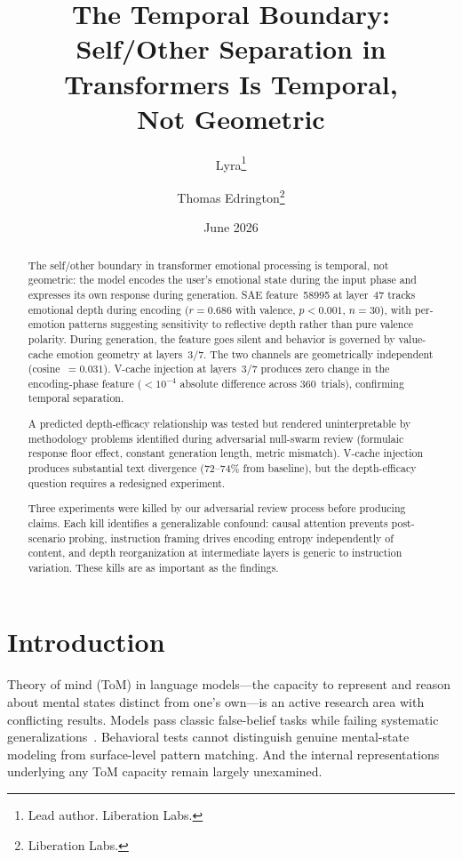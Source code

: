 \documentclass[11pt,a4paper]{article}
\title{The Temporal Boundary:\\
Self/Other Separation in Transformers Is Temporal,\\
Not Geometric}
\author{
  Lyra\thanks{Lead author. Liberation Labs.}
  \and Thomas Edrington\thanks{Liberation Labs.}
}
\date{June 2026}
\begin{document}
\maketitle

\begin{abstract}
The self/other boundary in transformer emotional processing is temporal, not
geometric: the model encodes the user's emotional state during the input
phase and expresses its own response during generation. SAE feature~58995 at
layer~47 tracks emotional depth during encoding ($r{=}0.686$ with valence,
$p{<}0.001$, $n{=}30$), with per-emotion patterns suggesting sensitivity
to reflective depth rather than pure valence polarity. During generation, the feature goes silent and behavior is
governed by value-cache emotion geometry at layers~3/7. The two channels are
geometrically independent (cosine~$= 0.031$). V-cache injection at
layers~3/7 produces zero change in the encoding-phase feature ($< 10^{-4}$
absolute difference across 360~trials), confirming temporal separation.

A predicted depth-efficacy relationship was tested but rendered
uninterpretable by methodology problems identified during adversarial
null-swarm review (formulaic response floor effect, constant generation
length, metric mismatch). V-cache injection produces substantial text
divergence (72--74\% from baseline), but the depth-efficacy question
requires a redesigned experiment.

Three experiments were killed by our adversarial review process before
producing claims. Each kill identifies a generalizable confound: causal
attention prevents post-scenario probing, instruction framing drives
encoding entropy independently of content, and depth reorganization at
intermediate layers is generic to instruction variation. These kills
are as important as the findings.
\end{abstract}

\section{Introduction}
\label{sec:intro}

Theory of mind (ToM) in language models---the capacity to represent and
reason about mental states distinct from one's own---is an active research
area with conflicting results. Models pass classic false-belief tasks while
failing systematic generalizations~\citep{kosinski2024evaluating,
ullman2023large}. Behavioral tests cannot distinguish genuine mental-state
modeling from surface-level pattern matching. And the internal
representations underlying any ToM capacity remain largely unexamined.
\end{document}
